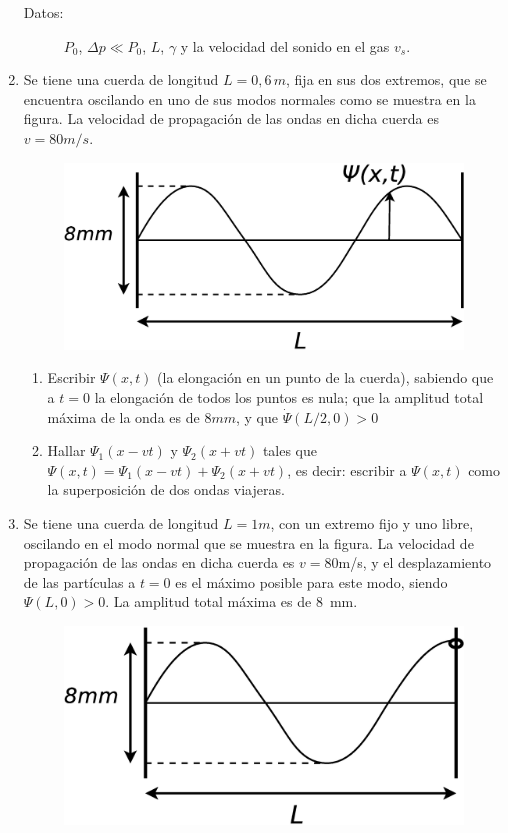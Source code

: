 \documentclass[11pt,spanish,a4paper]{article}
\begin{document}
\begin{enumerate}
\begin{description}
\item [{Datos:}] $P_{0}$, $\Delta p\ll P_{0}$, $L$, $\gamma$ y la velocidad
del sonido en el gas $v_{s}$.
\end{description}
\item Se tiene una cuerda de longitud $L=0,6\unit{\, m}$, fija en sus dos
extremos, que se encuentra oscilando en uno de sus modos normales
como se muestra en la figura. La velocidad de propagación de las ondas
en dicha cuerda es \(v=80 \unit{m/s}\).
\begin{figure}[H]
\centering{}\includegraphics[clip,scale=0.25]{ej1-32}
\end{figure}


\begin{enumerate}
	\item Escribir $\Psi(x,t)$ (la elongación en un punto de la cuerda), sabiendo que a $t=0$ la elongación de todos los puntos es nula; que la amplitud total máxima de la onda es de \(8\unit{mm}\), y que $\dot{\Psi}(L/2,0)>0$
	\item Hallar $\Psi_{1}(x-vt)$ y $\Psi_{2}(x+vt)$ tales que $\Psi(x,t)=\Psi_{1}(x-vt)+\Psi_{2}(x+vt)$,
es decir: escribir a $\Psi(x,t)$ como la superposición de dos ondas
viajeras.
\end{enumerate}

\item Se tiene una cuerda de longitud $L=1\unit{m}$, con un extremo fijo y uno
libre, oscilando en el modo normal que se muestra en la figura. La
velocidad de propagación de las ondas en dicha cuerda es $v=80$\unit{m/s},
y el desplazamiento de las partículas a $t=0$ es el máximo posible
para este modo, siendo $\Psi(L,0)>0$. La amplitud total máxima es
de \SI{8}{mm}.
\begin{figure}[H]
\centering{}\includegraphics[clip,scale=0.25]{ej1-33}
\end{figure}



\end{enumerate}
\end{document}
